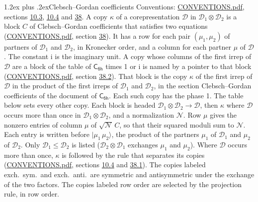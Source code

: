 \documentclass[10pt,a4paper]{article}
\makeatletter
\renewcommand\section{\@startsection{section}{1}{\z@}{-3ex plus -1ex minus -.2ex}%
  {1.2ex plus .2ex}{\normalfont\large\sffamily\bfseries\color{parttitle}}}
\numberwithin{equation}{section}
\newcommand{\grp}[1]{\mathsf{#1}}
\newcommand{\iunit}{\mathrm{i}}
\newcommand{\irrprod}{\otimes}
\newcommand{\mult}{\kappa}
\newcommand{\intx}{\mu}
\newcommand{\cgnorm}{\mathcal{N}}
\newcommand{\prodket}[2]{\lvert {#1}\,{#2}\rangle}
\makeatother
\begin{document}
\section{Clebsch--Gordan coefficients}\label{s:clebsch_gordan}
Conventions: \href{../../CONVENTIONS.pdf}{CONVENTIONS.pdf}, sections \href{../../../rotation/CONVENTIONS.pdf\#conv.10.3}{10.3}, \href{../../../rotation/CONVENTIONS.pdf\#conv.10.4}{10.4} and \href{../../CONVENTIONS.pdf\#conv.38}{38}.
\leavevmode\label{n:index.copy}\label{n:matrix.cg.stored}A copy $\mult$ of a corepresentation $\mathcal{D}$ in $\mathcal{D}_1\irrprod\mathcal{D}_2$ is a block $C$ of Clebsch--Gordan coefficients that satisfies two equations (\href{../../CONVENTIONS.pdf}{CONVENTIONS.pdf}, section \href{../../CONVENTIONS.pdf\#conv.38}{38}). \label{n:index.cg}It has a row for each pair $(\intx_1, \intx_2)$ of partners of $\mathcal{D}_1$ and $\mathcal{D}_2$, in Kronecker order, and a column for each partner $\intx$ of $\mathcal{D}$.
The constant $\iunit$ is the imaginary unit.
A copy whose columns of the first irrep of $\mathcal{D}$ are a block of the table of $\grp{C_{6h}}$ times 1 or $\iunit$ is named by a pointer to that block (\href{../../CONVENTIONS.pdf}{CONVENTIONS.pdf}, section \href{../../CONVENTIONS.pdf\#conv.38.2}{38.2}). That block is the copy $\mult$ of the first irrep of $\mathcal{D}$ in the product of the first irreps of $\mathcal{D}_1$ and $\mathcal{D}_2$, in the section Clebsch--Gordan coefficients of the document of \href{../../../rotation/data/pdf/C6h.pdf}{$\grp{C_{6h}}$}. Each such copy has the phase 1. The table below sets every other copy.
Each block is headed $\mathcal{D}_1\irrprod\mathcal{D}_2\to\mathcal{D}$, then $\mult$ where $\mathcal{D}$ occurs more than once in $\mathcal{D}_1\irrprod\mathcal{D}_2$, and a normalization $\cgnorm$. Row $\intx$ gives the nonzero entries of column $\intx$ of $\sqrt{\cgnorm}\,C$, so that their squared moduli sum to $\cgnorm$. \label{n:vector.ket.product}Each entry is written before $\prodket{\intx_1}{\intx_2}$, the product of the partners $\intx_1$ of $\mathcal{D}_1$ and $\intx_2$ of $\mathcal{D}_2$. Only $\mathcal{D}_1 \le \mathcal{D}_2$ is listed ($\mathcal{D}_2\irrprod\mathcal{D}_1$ exchanges $\intx_1$ and $\intx_2$).
Where $\mathcal{D}$ occurs more than once, $\mult$ is followed by the rule that separates its copies (\href{../../CONVENTIONS.pdf}{CONVENTIONS.pdf}, sections \href{../../../rotation/CONVENTIONS.pdf\#conv.10.4}{10.4} and \href{../../CONVENTIONS.pdf\#conv.38.1}{38.1}). \label{n:abbreviation.exchange}The copies labeled exch.\ sym.\ and exch.\ anti.\ are symmetric and antisymmetric under the exchange of the two factors. The copies labeled row order are selected by the projection rule, in row order.
\end{document}
